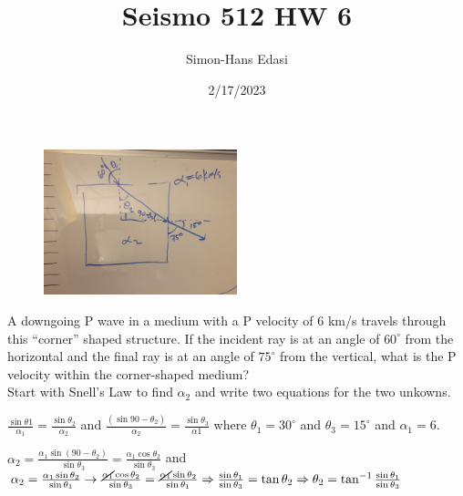 \documentclass{article}
\title{Seismo 512 HW 6}
\date{2/17/2023}
\author{Simon-Hans Edasi}
\begin{document}
	\maketitle

\section{}

\begin{figure}[H]
    \includegraphics[width=0.5\textwidth]{box_alpha.jpg}
\end{figure}

A downgoing P wave in a medium with a P velocity of 6 km/s travels through this “corner” shaped structure. If the incident ray is at an angle of $60^\circ$ from the horizontal and the final ray is at an angle of $75^\circ$ from the vertical, what is the P velocity within the corner-shaped medium?\\

Start with Snell's Law to find $\alpha_{2}$ and write two equations for the two unkowns.\\

\begin{center}
$\frac{\sin{\theta{1}}}{\alpha_{1}} = \frac{\sin{\theta_{2}}}{\alpha_{2}}$ and $\frac{\left(\sin90 - \theta_{2}\right)}{\alpha_{2}} = \frac{\sin{\theta_{3}}}{\alpha{1}}$ where $\theta_{1} = 30^\circ$ and $\theta_{3} = 15^\circ$ and $\alpha_{1} = 6$.
\end{center}

$\alpha_{2} = \frac{\alpha_{1}\sin\left(90 - \theta_{2}\right)}{\sin{\theta_{3}}} = \frac{\alpha_{1}\cos\theta_{2}}{\sin{\theta_{3}}}$ and $\alpha_{2} = \frac{\alpha_{1}\sin\theta_{2}}{\sin{\theta_{1}}} \rightarrow \frac{\cancel{\alpha_{1}}\cos\theta_{2}}{\sin{\theta_{3}}} = \frac{\cancel{\alpha_{1}}\sin\theta_{2}}{\sin{\theta_{1}}} \Rightarrow \frac{\sin{\theta_{1}}}{\sin{\theta_{3}}} = \tan{\theta_{2}} \Rightarrow \theta_{2} = \tan^{-1}{\frac{\sin{\theta_{1}}}{\sin{\theta_{3}}}}$  
\end{document}
